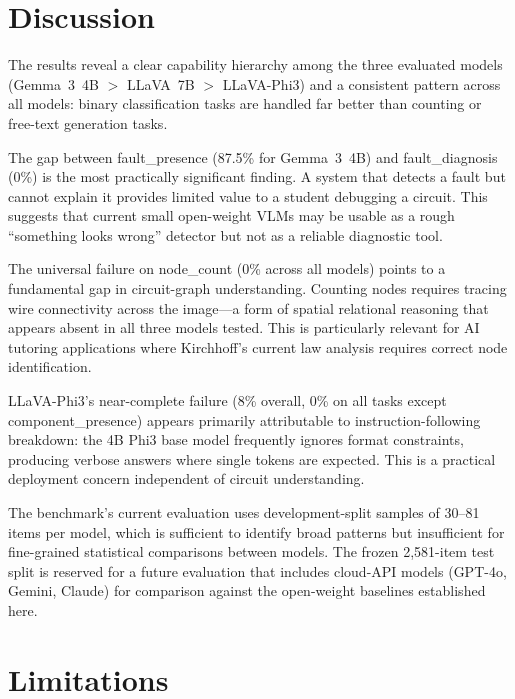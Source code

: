 \documentclass[conference]{IEEEtran}
\begin{document}
\section{Discussion}
\label{sec:discussion}

The results reveal a clear capability hierarchy among the three
evaluated models (Gemma~3~4B $>$ LLaVA~7B $>$ LLaVA-Phi3) and a
consistent pattern across all models: binary classification tasks are
handled far better than counting or free-text generation tasks.

The gap between fault\_presence (87.5\% for Gemma~3~4B) and
fault\_diagnosis (0\%) is the most practically significant finding.
A system that detects a fault but cannot explain it provides limited
value to a student debugging a circuit.
This suggests that current small open-weight VLMs may be usable as a
rough ``something looks wrong'' detector but not as a reliable
diagnostic tool.

The universal failure on node\_count (0\% across all models) points to
a fundamental gap in circuit-graph understanding.
Counting nodes requires tracing wire connectivity across the image---a
form of spatial relational reasoning that appears absent in all three
models tested.
This is particularly relevant for AI tutoring applications where
Kirchhoff's current law analysis requires correct node identification.

LLaVA-Phi3's near-complete failure (8\% overall, 0\% on all tasks
except component\_presence) appears primarily attributable to
instruction-following breakdown: the 4B Phi3 base model frequently
ignores format constraints, producing verbose answers where single
tokens are expected.
This is a practical deployment concern independent of circuit
understanding.

The benchmark's current evaluation uses development-split samples
of 30--81 items per model, which is sufficient to identify broad
patterns but insufficient for fine-grained statistical comparisons
between models.
The frozen 2,581-item test split is reserved for a future evaluation
that includes cloud-API models (GPT-4o, Gemini, Claude) for comparison
against the open-weight baselines established here.


\section{Limitations}
\label{sec:limitations}
\end{document}
